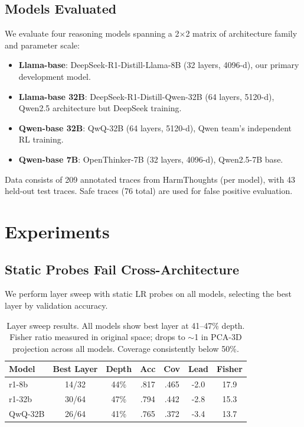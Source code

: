 \documentclass[11pt,a4paper]{article}
\begin{document}
\subsection{Models Evaluated}

We evaluate four reasoning models spanning a 2$\times$2 matrix of architecture family and parameter scale:
\begin{itemize}
\item \textbf{Llama-base}: DeepSeek-R1-Distill-Llama-8B (32 layers, 4096-d), our primary development model.
\item \textbf{Llama-base 32B}: DeepSeek-R1-Distill-Qwen-32B (64 layers, 5120-d), Qwen2.5 architecture but DeepSeek training.
\item \textbf{Qwen-base 32B}: QwQ-32B (64 layers, 5120-d), Qwen team's independent RL training.
\item \textbf{Qwen-base 7B}: OpenThinker-7B (32 layers, 4096-d), Qwen2.5-7B base.
\end{itemize}

Data consists of 209 annotated traces from HarmThoughts (per model), with 43 held-out test traces. Safe traces (76 total) are used for false positive evaluation.

\section{Experiments}

\subsection{Static Probes Fail Cross-Architecture}
\label{sec:static}

We perform layer sweep with static LR probes on all models, selecting the best layer by validation accuracy.

\begin{table}[t]
\centering
\small
\begin{tabular}{lcccccc}
\toprule
Model & Best Layer & Depth & Acc & Cov & Lead & Fisher \\
\midrule
r1-8b & 14/32 & 44\% & .817 & .465 & -2.0 & 17.9 \\
r1-32b & 30/64 & 47\% & .794 & .442 & -2.8 & 15.3 \\
QwQ-32B & 26/64 & 41\% & .765 & .372 & -3.4 & 13.7 \\
\bottomrule
\end{tabular}
\caption{Layer sweep results. All models show best layer at 41--47\% depth. Fisher ratio measured in original space; drops to $\sim$1 in PCA-3D projection across all models. Coverage consistently below 50\%.}
\label{tab:static}
\end{table}
\end{document}

